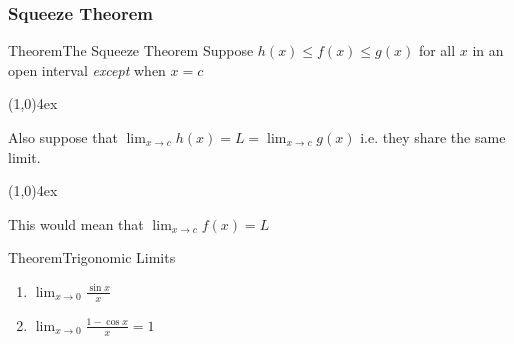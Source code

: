 \documentclass{MathNotes}
\newenvironment{theorem}[1]
{\begin{GrayBox}{Theorem}{#1}}{\end{GrayBox}}
\newcommand{\br}{
\begin{center}
\line(1,0){4ex}
\end{center}}
\begin{document}
\newpage
\subsubsection{Squeeze Theorem}\label{sec:1.2.2}

\begin{multicols}{2}[]
    \begin{theorem}{The Squeeze Theorem}
        Suppose $h(x)\leq f(x) \leq g(x)$ for all $x$ in an open interval
        \textit{except} when $x=c$
        \br

        Also suppose that $\displaystyle\lim_{x\to c}h(x)=L=\lim_{x\to c}g(x)$ i.e. they share
        the same limit.
        \br

        This would mean that $\lim_{x\to c}f(x)=L$
    \end{theorem}

    \begin{theorem}{Trigonomic Limits}
        \begin{enumerate}
            \item $\displaystyle\lim_{x\to 0}\frac{\sin x}{x}$
            \item $\displaystyle\lim_{x\to 0}\frac{1 - \cos x}{x} = 1$
        \end{enumerate}
    \end{theorem}

    \begin{center}
\end{center}
\end{multicols}
\end{document}
